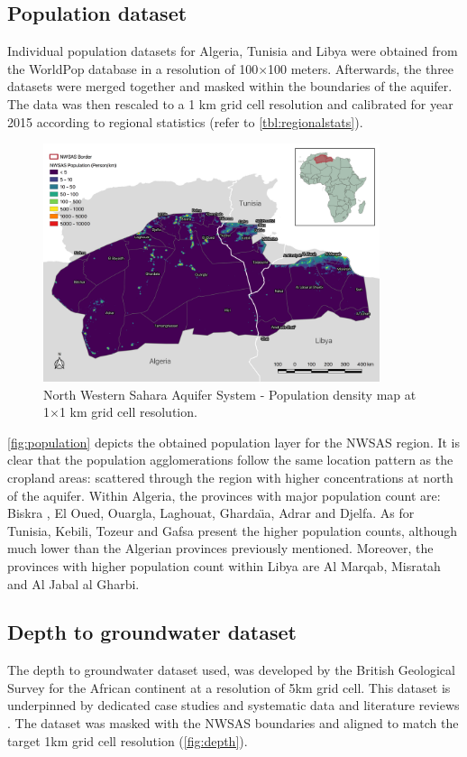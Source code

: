 \documentclass[12pt]{iopart}
\begin{document}
\subsection{Population dataset}
Individual population datasets for Algeria, Tunisia and Libya were obtained from the WorldPop database \cite{Worldpop} in a resolution of 100$\times$100 meters. Afterwards, the three datasets were merged together and masked within the boundaries of the aquifer. The data was then rescaled to a 1 km grid cell resolution and calibrated for year 2015 according to regional statistics (refer to \autoref{tbl:regionalstats}).

\begin{figure}[!ht]
	\centering
	\includegraphics[width=0.88\textwidth, cfbox=black 1pt 0pt]{NWSAS_Population}
	\caption[NWSAS population map]{North Western Sahara Aquifer System - Population density map at 1$\times$1 km grid cell resolution.}
	\label{fig:population}
\end{figure}

\autoref{fig:population} depicts the obtained population layer for the NWSAS region. It is clear that the population agglomerations follow the same location pattern as the cropland areas: scattered through the region with higher concentrations at north of the aquifer. Within Algeria, the provinces with major population count are: Biskra , El Oued, Ouargla, Laghouat, Gharda\"\i a, Adrar and Djelfa. As for Tunisia, Kebili, Tozeur and Gafsa present the higher population counts, although much lower than the Algerian provinces previously mentioned. Moreover, the provinces with higher population count within Libya are Al Marqab, Misratah and Al Jabal al Gharbi.

\subsection{Depth to groundwater dataset}
The depth to groundwater dataset used, was developed by the British Geological Survey for the African continent at a resolution of 5km grid cell. This dataset is underpinned by dedicated case studies and systematic data and literature reviews \cite{Quantitativemapsgroundwater2012a}. The dataset was masked with the NWSAS boundaries and aligned to match the target 1km grid cell resolution (\autoref{fig:depth}).
\end{document}
